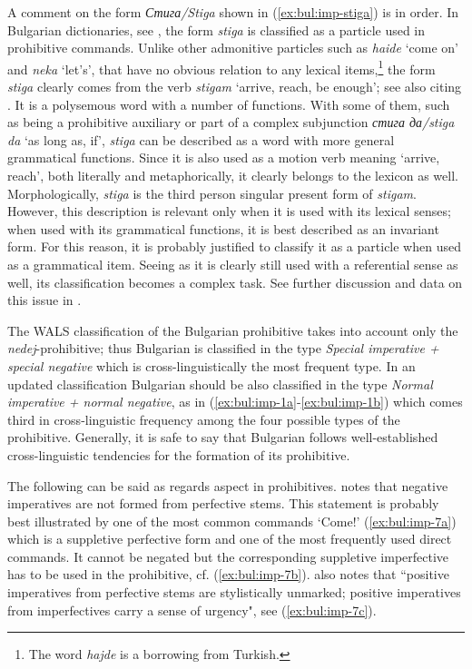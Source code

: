 \documentclass[output=paper,colorlinks=true, citecolor=brown]{langscibook}
\begin{document}
A comment on the form \textit{Стига\slash Stiga} shown in (\ref{ex:bul:imp-stiga}) is in order. In Bulgarian dictionaries, see \citet[925--926]{PopovEtAl1994}, the form \textit{stiga} is classified as a particle used in prohibitive commands. Unlike other admonitive particles such as \textit{haide} `come on' and \textit{neka} `let's', that have no obvious relation to any lexical items,\footnote{The word \textit{hajde} is a borrowing from Turkish.} the form \textit{stiga} clearly comes from the verb \textit{stigam} `arrive, reach, be enough'; see also \citet[11]{Auwera2006} citing \citet[166]{Greenberg1996}. 
It is a polysemous word with a number of functions. With some of them, such as being a prohibitive auxiliary or part of a complex subjunction \textit{стига да\slash stiga da} `as long as, if', \textit{stiga} can be described as a word with more general grammatical functions. Since it is also used as a motion verb meaning `arrive, reach', both literally and metaphorically, it clearly belongs to the lexicon as well. Morphologically, \textit{stiga} is the third person singular present form of \textit{stigam}. However, this description is relevant only when it is used with its lexical senses; when used with its grammatical functions, it is best described as an invariant form. For this reason, it is probably justified to classify it as a particle when used as a grammatical item. Seeing as it is clearly still used with a referential sense as well, its classification becomes a complex task. See further discussion and data on this issue in . 

The WALS classification \citep{wals-71} of the Bulgarian prohibitive takes into account only the \textit{nedej}-prohibitive; thus Bulgarian is classified in the type \textit{Special imperative + special negative} which is cross-linguistically the most frequent type. In an updated classification Bulgarian should be also classified in the type \textit{Normal imperative + normal negative}, as in (\ref{ex:bul:imp-1a}-\ref{ex:bul:imp-1b}) which comes third in cross-linguistic frequency among the four possible types of the prohibitive. Generally, it is safe to say that Bulgarian follows well-established cross-linguistic tendencies for the formation of its prohibitive.

The following can be said as regards aspect in prohibitives. \citet[46]{Scatton1980} notes that negative imperatives are not formed from perfective stems. This statement is probably best illustrated by one of the most common commands `Come!' (\ref{ex:bul:imp-7a}) which is a suppletive perfective form and one of the most frequently used direct commands. It cannot be negated but the corresponding suppletive imperfective has to be used in the prohibitive, cf. (\ref{ex:bul:imp-7b}). \citet[46]{Scatton1980} also notes that “positive imperatives from perfective stems are stylistically unmarked; positive imperatives from imperfectives carry a sense of urgency", see (\ref{ex:bul:imp-7c}). 
\end{document}
